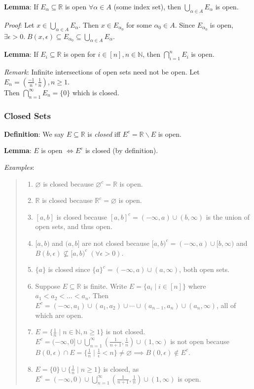\documentclass[11pt]{article}
\begin{document}
\textbf{Lemma}: If $E_\alpha \subseteq \mathbb{R}$ is open $\forall \alpha \in A$ (some index set), then $\bigcup_{\alpha \in A} E_\alpha$ is open.

\emph{Proof}: Let $x \in \bigcup_{\alpha \in A} E_\alpha$. Then $x \in E_{\alpha_0}$ for some $\alpha_0 \in A$. Since $E_{\alpha_0}$ is open, $\exists \epsilon > 0.\; B(x, \epsilon) \subseteq E_{\alpha_0} \subseteq \bigcup_{\alpha \in A} E_\alpha$.

\textbf{Lemma}: If $E_i \subseteq \mathbb{R}$ is open for $i \in [n], n \in \mathbb{N}$, then $\bigcap_{i=1}^n E_i$ is open.

\emph{Remark}: Infinite intersections of open sets need not be open. Let $E_n = (\frac{-1}{n}, \frac{1}{n}), n \geq 1$.\\
Then $\bigcap_{n=1}^\infty E_n = \{0\}$ which is closed.

\subsubsection{Closed Sets}

\textbf{Definition}: We say $E \subseteq \mathbb{R}$ is \emph{closed} iff $E^c = \mathbb{R} \backslash E$ is open.

\textbf{Lemma}: $E$ is open $\iff E^c$ is closed (by definition).

\emph{Examples}:
\begin{quote}\vspace{-0.3cm}
	\begin{enumerate}
	\item $\varnothing$ is closed because $\varnothing^c = \mathbb{R}$ is open.
	\item $\mathbb{R}$ is closed because $\mathbb{R}^c = \varnothing$ is open.
	\item $[a,b]$ is closed because $[a,b]^c = (-\infty, a) \cup (b, \infty)$ is the union of open sets, and thus open.
	\item $[a,b)$ and $(a,b]$ are not closed because $[a,b)^c = (-\infty, a) \cup [b, \infty)$ and $B(b, \epsilon) \not \subseteq [a,b)^c \;(\forall \epsilon > 0)$.
	\item $\{a\}$ is closed since $\{a\}^c = (-\infty, a) \cup (a, \infty)$, both open sets.
	\item Suppose $E \subseteq \mathbb{R}$ is finite. Write $E = \{a_i \mid i \in [n]\}$ where $a_1 < a_2 < \ldots < a_n$. Then $E^c = (-\infty, a_1) \cup (a_1, a_2) \cup \cdots \cup (a_{n-1}, a_n) \cup (a_n, \infty)$, all of which are open.
	\item $E = \{\frac{1}{n} \mid n \in \mathbb{N}, n \geq 1\}$ is not closed. $E^c = (-\infty, 0] \cup \bigcup_{n=1}^\infty (\frac{1}{n+1}, \frac{1}{n}) \cup (1, \infty)$ is not open because $B(0, \epsilon) \cap E = \{\frac{1}{n} \mid \frac{1}{\epsilon} < n\} \neq \varnothing \implies B(0, \epsilon) \notin E^c$.
	\item $E = \{0\} \cup \{\frac{1}{n} \mid n \geq 1\}$ is closed, as $E^c = (-\infty, 0) \cup \bigcup_{n=1}^\infty (\frac{1}{n+1}, \frac{1}{n}) \cup (1, \infty)$ is open.
	\end{enumerate}
\end{quote}
\end{document}

